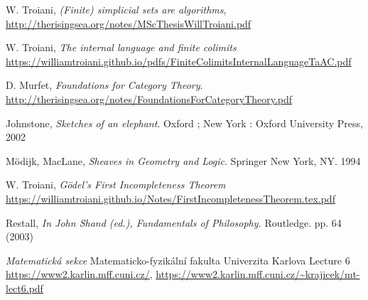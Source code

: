 \documentclass[12pt]{article}
\theoremstyle{plain}
\theoremstyle{definition}
\begin{document}
	\begin{thebibliography}{9}
		 W. Troiani, \emph{(Finite) simplicial sets are algorithms}, \url{http://therisingsea.org/notes/MScThesisWillTroiani.pdf}
		
		 W. Troiani, \emph{The internal language and finite colimits} \url{https://williamtroiani.github.io/pdfs/FiniteColimitsInternalLanguageTaAC.pdf}
		
		 D. Murfet, \emph{Foundations for Category Theory}. \url{http://therisingsea.org/notes/FoundationsForCategoryTheory.pdf}
		
		 Johnstone, \emph{Sketches of an elephant}. Oxford ; New York : Oxford University Press, 2002
		
		 M\"{o}dijk, MacLane, \emph{Sheaves in Geometry and Logic}. Springer New York, NY. 1994
		
		 W. Troiani, \emph{G\"{o}del's First Incompleteness Theorem} \url{https://williamtroiani.github.io/Notes/FirstIncompletenessTheorem.tex.pdf}
		
		\bibitem{} Restall, \emph{In John Shand (ed.), Fundamentals of Philosophy.} Routledge. pp. 64 (2003)
		
		\emph{Matematická sekce
		} 
	Matematicko-fyzikální fakulta
Univerzita Karlova Lecture 6 \url{https://www2.karlin.mff.cuni.cz/}, \url{https://www2.karlin.mff.cuni.cz/~krajicek/mt-lect6.pdf}
		
	\end{thebibliography}
	
	
	
	
\end{document}
